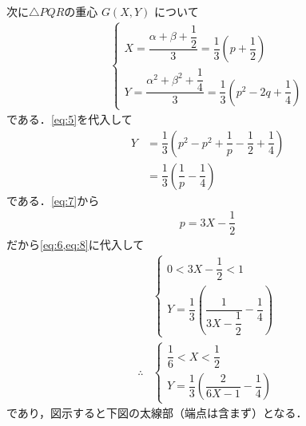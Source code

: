 \documentclass[../../main.tex]{subfiles}
\begin{document}
次に$\triangle PQR$の重心 $G(X,Y)$ について
\begin{align}
  \begin{cases}
    X = \dfrac{\alpha+\beta+\dfrac{1}{2}}{3} = \dfrac{1}{3}(p+\dfrac{1}{2})  \\
    Y = \dfrac{\alpha^2+\beta^2+\dfrac{1}{4}}{3} = \dfrac{1}{3}(p^2-2q+\dfrac{1}{4})
  \end{cases} \label{eq:7}
\end{align}
である．\cref{eq:5}を代入して
\begin{align}
  Y & = \dfrac{1}{3} \left( p^2 - p^2 + \dfrac{1}{p} - \dfrac{1}{2} + \dfrac{1}{4} \right) \\
  & = \dfrac{1}{3}(\dfrac{1}{p} - \dfrac{1}{4}) \label{eq:8}
\end{align}
である．\cref{eq:7}から
\begin{align}
  p = 3X - \dfrac{1}{2} \label{eq:9}
\end{align}
だから\cref{eq:6,eq:8}に代入して
\begin{align}
  &
  \begin{cases}
    0 < 3X - \dfrac{1}{2} < 1 \\
    Y = \dfrac{1}{3} \left( \dfrac{1}{3X-\dfrac{1}{2}} - \dfrac{1}{4} \right)
  \end{cases} \\
  \therefore
  &
  \begin{cases}
    \dfrac{1}{6} < X < \dfrac{1}{2} \\
    Y = \dfrac{1}{3} \left( \dfrac{2}{6X-1} - \dfrac{1}{4} \right)
  \end{cases}
\end{align}
であり，図示すると下図の太線部（端点は含まず）となる．
\end{document}
